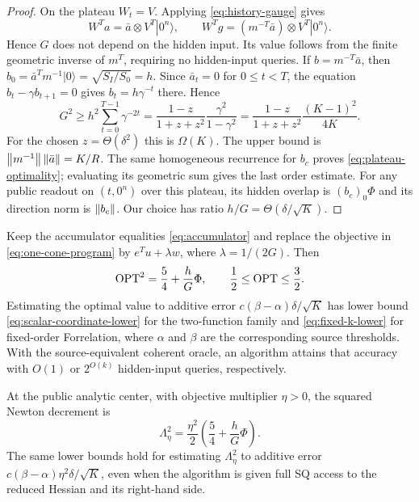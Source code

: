 \begin{proof}
On the plateau $W_t=V$.  Applying \eqref{eq:history-gauge} gives
\[
 W^Ta=\bar a\otimes V^T|0^n\rangle,\qquad
 W^Tg=(m^{-T}\bar a)\otimes V^T|0^n\rangle.
\]
Hence $G$ does not depend on the hidden input.  Its value
follows from
the finite geometric inverse of $m^T$, requiring no hidden-input queries.
If $b=m^{-T}\bar a$, then
$b_0=\bar a^Tm^{-1}|0\rangle=\sqrt{S_I/S_0}=h$.
Since $\bar a_t=0$ for $0\leq t<T$, the equation
$b_t-\gamma b_{t+1}=0$ gives $b_t=h\gamma^{-t}$ there.  Hence
\begin{equation}\label{eq:G-lower}
 G^2\geq h^2\sum_{t=0}^{T-1}\gamma^{-2t}
 =\frac{1-z}{1+z+z^2}\frac{\gamma^2}{1-\gamma^2}
 =\frac{1-z}{1+z+z^2}\frac{(K-1)^2}{4K}.
\end{equation}
For the chosen $z=\Theta(\delta^2)$ this is $\Omega(K)$.
The upper bound is $\left\lVert m^{-1}\right\rVert\left\lVert\bar a\right\rVert=K/R$.
The same homogeneous recurrence for $b_c$ proves
\eqref{eq:plateau-optimality}; evaluating its geometric sum gives the
last order estimate.  For any public readout on $(t,0^n)$ over this
plateau, its hidden overlap is $(b_c)_0\Phi$ and its direction norm is
$\left\lVert b_c\right\rVert$.  Our choice has ratio $h/G=\Theta(\delta/\sqrt K)$.
\end{proof}

\begin{theorem}\label{thm:tilted-value}
Keep the accumulator equalities \eqref{eq:accumulator} and replace the
objective in \eqref{eq:one-cone-program} by $e^Tu+\lambda w$, where
$\lambda=1/(2G)$.
Then
\begin{equation}\label{eq:tilted-value}
 \operatorname{OPT}^2=\frac54+\frac hG\Phi,\qquad \frac12\leq\operatorname{OPT}\leq\frac32.
\end{equation}
Estimating the optimal value to additive error
$c(\beta-\alpha)\delta/\sqrt K$ has lower bound
\eqref{eq:scalar-coordinate-lower} for the two-function family and
\eqref{eq:fixed-k-lower} for fixed-order Forrelation, where $\alpha$ and
$\beta$ are the corresponding source thresholds.
With the source-equivalent coherent oracle, an algorithm attains that
accuracy with $O(1)$ or $2^{O(k)}$ hidden-input queries, respectively.

At the public analytic center, with objective multiplier $\eta>0$, the
squared Newton decrement is
\begin{equation}\label{eq:tilted-decrement}
 \Lambda_\eta^2
 =\frac{\eta^2}{2}\left(\frac54+\frac hG\Phi\right).
\end{equation}
The same lower bounds hold for estimating $\Lambda_\eta^2$ to additive
error $c(\beta-\alpha)\eta^2\delta/\sqrt K$, even when the algorithm is
given full SQ access to the reduced Hessian and its right-hand side.
\end{theorem}

